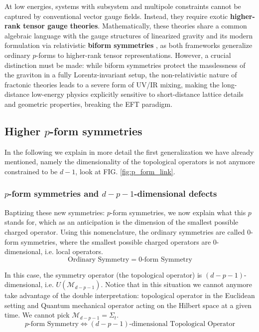 \documentclass[aps,preprint,nofootinbib,preprintnumbers,eqsecnum,superscriptaddress]{revtex4}
\numberwithin{equation}{section}
\begin{document}
At low energies, systems with subsystem and multipole constraints cannot be captured by conventional vector gauge fields. Instead, they require exotic \textbf{higher-rank tensor gauge theories}. Mathematically, these theories share a common algebraic language with the gauge structures of linearized gravity and its modern formulation via relativistic \textbf{biform symmetries} \cite{Hinterbichler_2023}, as both frameworks generalize ordinary $p$-forms to higher-rank tensor representations. However, a crucial distinction must be made: while biform symmetries protect the masslessness of the graviton in a fully Lorentz-invariant setup, the non-relativistic nature of fractonic theories leads to a severe form of UV/IR mixing, making the long-distance low-energy physics explicitly sensitive to short-distance lattice details and geometric properties, breaking the EFT paradigm.


\subsection{Higher $p$-form symmetries} \label{sec:p-form_sym}

In the following we explain in more detail the first generalization we have already mentioned, namely the dimensionality of the topological operators is not anymore constrained to be $d-1$, look at FIG. \ref{fig:p_form_link}. 

  \subsubsection{$p$-form symmetries and $d-p-1$-dimensional defects}
Baptizing these new symmetries: $p$-form symmetries, we now explain what this $p$ stands for, which as an anticipation is the dimension of the smallest possible charged operator. Using this nomenclature, the ordinary symmetries are called $0$-form symmetries, where the smallest possible charged operators are $0$-dimensional, i.e. local operators.
\begin{equation}
    \text{Ordinary Symmetry} = \text{$0$-form Symmetry}
\end{equation}

In this case, the symmetry operator (the topological operator) is $(d-p-1)$-dimensional, i.e. $U(\mathcal{M}_{d-p-1})$. Notice that in this situation we cannot anymore take advantage of the double interpretation: topological operator in the Euclidean setting and Quantum mechanical operator acting on the Hilbert space at a given time. We cannot pick $\mathcal{M}_{d-p-1} = \Sigma_t$.
\begin{equation}
    \text{$p$-form Symmetry} \iff \text{$(d-p-1)$-dimensional Topological Operator}
\end{equation}
\end{document}
